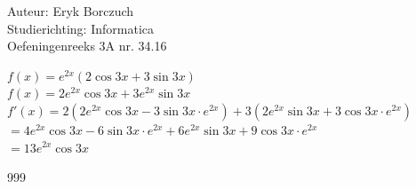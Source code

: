 \documentclass[a4paper]{article}
\begin{document}
  
\noindent \large Auteur: Eryk Borczuch \\
\noindent \large Studierichting: Informatica\\
\noindent \large Oefeningenreeks 3A nr. 34.16\\

\medskip

\normalsize

$f(x) = e^{2x}(2 \cos 3x + 3\sin 3x)$\\

$f(x) = 2 e^{2x} \cos 3x + 3 e^{2x} \sin 3x$\\

$f'(x) = 2(2e^{2x} \cos 3x - 3 \sin 3x \cdot e^{2x})+3(2 e^{2x} \sin 3x + 3 \cos 3x \cdot e^{2x})$\\

$= 4 e^{2x} \cos 3x - 6 \sin 3x \cdot e^{2x}+ 6 e^{2x}\sin 3x + 9 \cos3x \cdot e^{2x}$\\

$= 13 e^{2x} \cos 3x$\\

\begin{thebibliography}{999}
\end{thebibliography}
\end{document}
